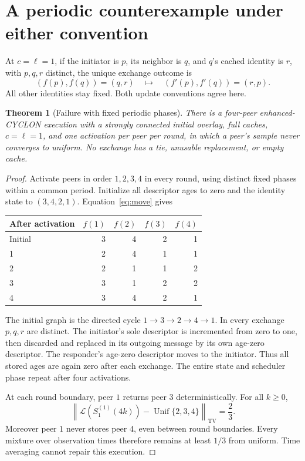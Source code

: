 \documentclass[11pt]{article}
\newtheorem{theorem}{Theorem}
\newcommand{\TV}{\mathrm{TV}}
\newcommand{\Unif}{\operatorname{Unif}}
\newcommand{\Law}{\mathcal L}
\begin{document}
\section{A periodic counterexample under either convention}

At $c=\ell=1$, if the initiator is $p$, its neighbor is $q$, and
$q$'s cached identity is $r$, with $p,q,r$ distinct, the unique
exchange outcome is
\begin{equation}
 (f(p),f(q))=(q,r)\quad\longmapsto\quad
 (f'(p),f'(q))=(r,p).
 \label{eq:move}
\end{equation}
All other identities stay fixed. Both update conventions agree here.

\begin{theorem}[Failure with fixed periodic phases]
\label{thm:periodic}
There is a four-peer enhanced-CYCLON execution with a strongly connected
initial overlay, full caches, $c=\ell=1$, and one activation per peer
per round, in which a peer's sample never converges to uniform.
No exchange has a tie, unusable replacement, or empty cache.
\end{theorem}
\begin{proof}
Activate peers in order $1,2,3,4$ in every round, using distinct fixed
phases within a common period. Initialize all descriptor ages to zero
and the identity state to $(3,4,2,1)$. Equation~\eqref{eq:move} gives
\begin{center}
\begin{tabular}{lrrrr}
\toprule
After activation & $f(1)$ & $f(2)$ & $f(3)$ & $f(4)$\\
\midrule
Initial & 3 & 4 & 2 & 1\\
1 & 2 & 4 & 1 & 1\\
2 & 2 & 1 & 1 & 2\\
3 & 3 & 1 & 2 & 2\\
4 & 3 & 4 & 2 & 1\\
\bottomrule
\end{tabular}
\end{center}
The initial graph is the directed cycle $1\to3\to2\to4\to1$.
In every exchange $p,q,r$ are distinct. The initiator's sole descriptor
is incremented from zero to one, then discarded and replaced in its
outgoing message by its own age-zero descriptor. The responder's
age-zero descriptor moves to the initiator. Thus all stored ages are
again zero after each exchange. The entire state and scheduler phase
repeat after four activations.

At each round boundary, peer $1$ returns peer $3$ deterministically.
For all $k\ge0$,
\[
 \left\|\Law(S_1^{(1)}(4k))-\Unif\{2,3,4\}\right\|_{\TV}=\frac23.
\]
Moreover peer $1$ never stores peer $4$, even between round boundaries.
Every mixture over observation times therefore remains at least
$1/3$ from uniform. Time averaging cannot repair this execution.
\end{proof}
\end{document}
